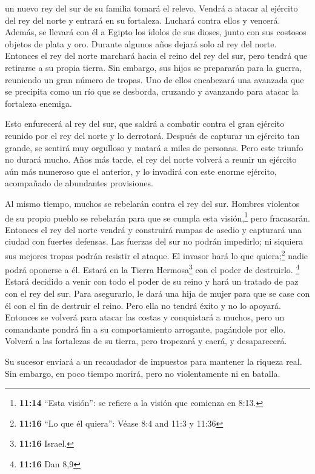  un nuevo rey del sur de su familia tomará el relevo.
Vendrá a atacar al ejército del rey del norte y entrará en su fortaleza.
Luchará contra ellos y vencerá.  Además, se llevará con él
a Egipto los ídolos de sus dioses, junto con sus costosos objetos de
plata y oro. Durante algunos años dejará solo al rey del norte.
 Entonces el rey del norte marchará hacia el reino del rey
del sur, pero tendrá que retirarse a su propia tierra. 
Sin embargo, sus hijos se prepararán para la guerra, reuniendo un gran
número de tropas. Uno de ellos encabezará una avanzada que se precipita
como un río que se desborda, cruzando y avanzando para atacar la
fortaleza enemiga.

 Esto enfurecerá al rey del sur, que saldrá a combatir
contra el gran ejército reunido por el rey del norte y lo derrotará.
 Después de capturar un ejército tan grande, se sentirá
muy orgulloso y matará a miles de personas. Pero este triunfo no durará
mucho.  Años más tarde, el rey del norte volverá a reunir
un ejército aún más numeroso que el anterior, y lo invadirá con este
enorme ejército, acompañado de abundantes provisiones.

 Al mismo tiempo, muchos se rebelarán contra el rey del
sur. Hombres violentos de su propio pueblo se rebelarán para que se
cumpla esta visión,\footnote{\textbf{11:14} ``Esta visión'': se refiere
  a la visión que comienza en 8:13.} pero fracasarán. 
Entonces el rey del norte vendrá y construirá rampas de asedio y
capturará una ciudad con fuertes defensas. Las fuerzas del sur no podrán
impedirlo; ni siquiera sus mejores tropas podrán resistir el ataque.
 El invasor hará lo que quiera;\footnote{\textbf{11:16}
  ``Lo que él quiera'': Véase 8:4 and 11:3 y 11:36} nadie podrá oponerse
a él. Estará en la Tierra Hermosa\footnote{\textbf{11:16} Israel.} con
el poder de destruirlo. \footnote{\textbf{11:16} Dan 8,9}
 Estará decidido a venir con todo el poder de su reino y
hará un tratado de paz con el rey del sur. Para asegurarlo, le dará una
hija de mujer para que se case con él con el fin de destruir el reino.
Pero ella no tendrá éxito y no lo apoyará.  Entonces se
volverá para atacar las costas y conquistará a muchos, pero un
comandante pondrá fin a su comportamiento arrogante, pagándole por ello.
 Volverá a las fortalezas de su tierra, pero tropezará y
caerá, y desaparecerá.

 Su sucesor enviará a un recaudador de impuestos para
mantener la riqueza real. Sin embargo, en poco tiempo morirá, pero no
violentamente ni en batalla.

